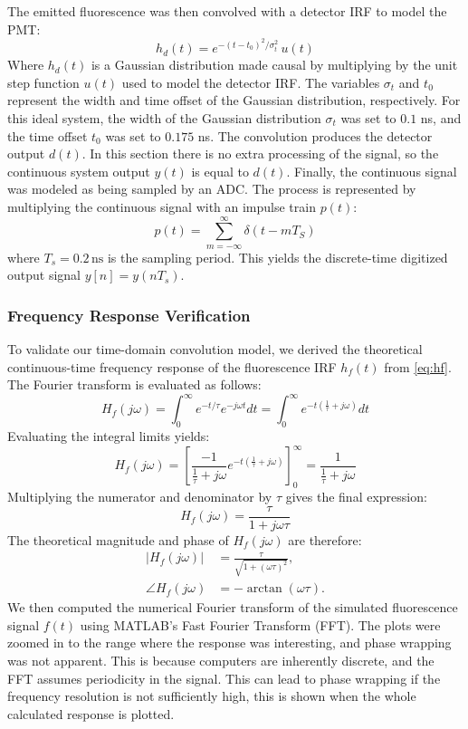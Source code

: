 \documentclass[conference]{IEEEtran}
\begin{document}
The emitted fluorescence was then convolved with a detector IRF to model the PMT:
\begin{equation}
    h_d(t) = e^{-(t-t_0)^2/\sigma_t^2} \, u(t)
    \label{eq:hd}
\end{equation}
Where $h_d(t)$ is a Gaussian distribution made causal by multiplying by the unit step function $u(t)$ used to model the detector IRF.
The variables $\sigma_t$ and $t_0$ represent the width and time offset of the Gaussian distribution, respectively.
For this ideal system, the width of the Gaussian distribution $\sigma_t$ was set to $0.1$ ns, and the time offset $t_0$ was set to $0.175$ ns.
The convolution produces the detector output $d(t)$. In this section there is no extra processing of the signal, so the continuous system output $y(t)$ is equal to $d(t)$.
Finally, the continuous signal was modeled as being sampled by an ADC. The process is represented by multiplying the continuous signal with an impulse train $p(t)$:
\begin{equation}
    p(t) = \sum_{m=-\infty}^{\infty} \delta(t - mT_S)
    \label{eq:pt}
\end{equation}
where $T_s = 0.2\,\text{ns}$ is the sampling period. This yields the discrete-time digitized output signal $y[n] = y(nT_s)$.

\subsubsection{Frequency Response Verification}

To validate our time-domain convolution model, we derived the theoretical continuous-time frequency response of the fluorescence IRF $h_f(t)$ from \eqref{eq:hf}.
The Fourier transform is evaluated as follows:
$$
    H_f(j\omega) = \int_{0}^{\infty} e^{-t/\tau} e^{-j\omega t} dt = \int_{0}^{\infty} e^{-t\left(\frac{1}{\tau} + j\omega\right)} dt
$$
Evaluating the integral limits yields:
$$
    H_f(j\omega) = \left[ \frac{-1}{\frac{1}{\tau} + j\omega} e^{-t\left(\frac{1}{\tau} + j\omega\right)} \right]_{0}^{\infty} = \frac{1}{\frac{1}{\tau} + j\omega}
$$
Multiplying the numerator and denominator by $\tau$ gives the final expression:
\begin{equation}
    H_f(j\omega) = \frac{\tau}{1 + j\omega\tau}
    \label{eq:Hf}
\end{equation}
The theoretical magnitude and phase of $H_f(j\omega)$ are therefore:
\begin{align}
    |H_f(j\omega)| &= \frac{\tau}{\sqrt{1 + (\omega\tau)^2}}, \label{eq:Hf_mag} \\
    \angle H_f(j\omega) &= -\arctan(\omega\tau). \label{eq:Hf_phase}
\end{align}
We then computed the numerical Fourier transform of the simulated fluorescence signal $f(t)$ using MATLAB's Fast Fourier Transform (FFT).
The plots were zoomed in to the range where the response was interesting, and phase wrapping was not apparent.
This is because computers are inherently discrete, and the FFT assumes periodicity in the signal.
This can lead to phase wrapping if the frequency resolution is not sufficiently high, this is shown when the whole calculated response is plotted.
\end{document}
